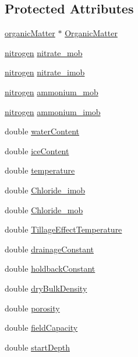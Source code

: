 \subsection*{Protected Attributes}
\begin{DoxyCompactItemize}
\item 
\hyperlink{classorganic_matter}{organicMatter} $\ast$ \hyperlink{classsoil_layer_a2a435b2ee0bb8fc085bfd8e418339c9f}{OrganicMatter}
\item 
\hyperlink{classnitrogen}{nitrogen} \hyperlink{classsoil_layer_aa5d5dd2021604f5ce457550571689bb7}{nitrate\_\-mob}
\item 
\hyperlink{classnitrogen}{nitrogen} \hyperlink{classsoil_layer_a94f7dd776e541528ee10c8bba3810d8c}{nitrate\_\-imob}
\item 
\hyperlink{classnitrogen}{nitrogen} \hyperlink{classsoil_layer_a46a692f84c465b139ac6ba90f00929c8}{ammonium\_\-mob}
\item 
\hyperlink{classnitrogen}{nitrogen} \hyperlink{classsoil_layer_afcca8c6729c4acfef5af17e79f06640a}{ammonium\_\-imob}
\item 
double \hyperlink{classsoil_layer_aa9ba9dbe9052bd34f5db9a05f85eeada}{waterContent}
\item 
double \hyperlink{classsoil_layer_a57ae095602c7294364a449b2ee13ec1d}{iceContent}
\item 
double \hyperlink{classsoil_layer_a8c100de8f42bdeee54f33f8df188ba6e}{temperature}
\item 
double \hyperlink{classsoil_layer_a969901a8fb6ed843156e09d78655dbe4}{Chloride\_\-imob}
\item 
double \hyperlink{classsoil_layer_a9864a5b154fa8571ef715324b3c58722}{Chloride\_\-mob}
\item 
double \hyperlink{classsoil_layer_a9d84413d44f869d41635363bf2de0e04}{TillageEffectTemperature}
\item 
double \hyperlink{classsoil_layer_a995f64ed0bb7052bee9be257daa0b346}{drainageConstant}
\item 
double \hyperlink{classsoil_layer_ae050c0e0b52e07baf301a5bbebc239db}{holdbackConstant}
\item 
double \hyperlink{classsoil_layer_ad190ee5264df24788ae2854167ad92c1}{dryBulkDensity}
\item 
double \hyperlink{classsoil_layer_abc113be3a910c24109309495a62d35ee}{porosity}
\item 
double \hyperlink{classsoil_layer_a611720c51fe1a74360b4afb29161617b}{fieldCapacity}
\item 
double \hyperlink{classsoil_layer_acbee67e83ac96f6906c03498366616b6}{startDepth}

\end{DoxyCompactItemize}
